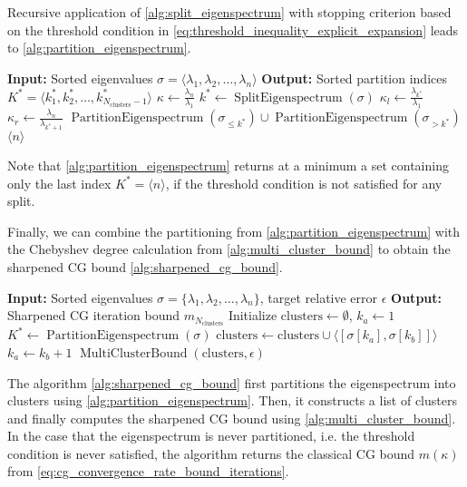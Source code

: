 Recursive application of \cref{alg:split_eigenspectrum} with stopping criterion based on the threshold condition in \cref{eq:threshold_inequality_explicit_expansion} leads to \cref{alg:partition_eigenspectrum}.
\begin{algorithm}[H]
    \caption{$\operatorname{PartitionEigenspectrum}(\sigma)$}
    \begin{algorithmic}[1]
        \State \textbf{Input:} Sorted eigenvalues $\sigma = \langle\lambda_1, \lambda_2, \ldots, \lambda_n\rangle$
        \State \textbf{Output:} Sorted partition indices $K^* = \langle k^*_1, k^*_2, \ldots, k^*_{N_{\text{clusters}}-1}\rangle$
        \State $\kappa \gets \frac{\lambda_n}{\lambda_1}$
        \State $k^* \gets \operatorname{SplitEigenspectrum}(\sigma)$
        \State $\kappa_l \gets \frac{\lambda_{k^*}}{\lambda_1}$
        \State $\kappa_r \gets \frac{\lambda_n}{\lambda_{k^*+1}}$
            \State \Return $\operatorname{PartitionEigenspectrum}(\sigma_{\leq k^*}) \cup \operatorname{PartitionEigenspectrum}(\sigma_{>k^*})$
        \Else
            \State \Return $\langle n \rangle$ 
        \EndIf
    \end{algorithmic}
    \label{alg:partition_eigenspectrum}
\end{algorithm}
Note that \cref{alg:partition_eigenspectrum} returns at a minimum a set containing only the last index $K^*= \langle n \rangle$, if the threshold condition is not satisfied for any split.

Finally, we can combine the partitioning from \cref{alg:partition_eigenspectrum} with the Chebyshev degree calculation from \cref{alg:multi_cluster_bound} to obtain the sharpened CG bound \cref{alg:sharpened_cg_bound}.
\begin{algorithm}[H]
    \caption{$\operatorname{SharpenedCGIterationBound}(\sigma, \epsilon)$}
    \begin{algorithmic}[1]
        \State \textbf{Input:} Sorted eigenvalues $\sigma = \{\lambda_1, \lambda_2, \ldots, \lambda_n\}$, target relative error $\epsilon$
        \State \textbf{Output:} Sharpened CG iteration bound $m_{N_{\text{clusters}}}$
        \State Initialize $\text{clusters} \gets \emptyset$, $k_a \gets 1$
        \State $K^* \gets \operatorname{PartitionEigenspectrum}(\sigma)$
            \State $\text{clusters} \gets \text{clusters} \cup \langle[\sigma[k_a], \sigma[k_b]]\rangle$
            \State $k_a \gets k_b + 1$
        \EndFor
        \State \Return $\operatorname{MultiClusterBound}(\text{clusters}, \epsilon)$
    \end{algorithmic}
    \label{alg:sharpened_cg_bound}
\end{algorithm}
The algorithm \cref{alg:sharpened_cg_bound} first partitions the eigenspectrum into clusters using \cref{alg:partition_eigenspectrum}. Then, it constructs a list of clusters and finally computes the sharpened CG bound using \cref{alg:multi_cluster_bound}. In the case that the eigenspectrum is never partitioned, i.e. the threshold condition is never satisfied, the algorithm returns the classical CG bound $m(\kappa)$ from \cref{eq:cg_convergence_rate_bound_iterations}.